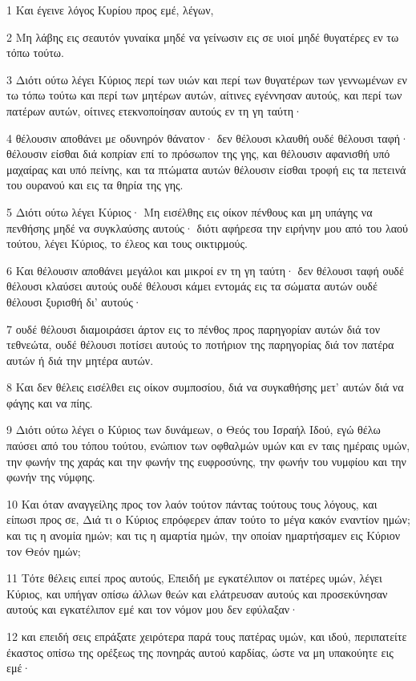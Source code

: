 \par 1 Και έγεινε λόγος Κυρίου προς εμέ, λέγων,
\par 2 Μη λάβης εις σεαυτόν γυναίκα μηδέ να γείνωσιν εις σε υιοί μηδέ θυγατέρες εν τω τόπω τούτω.
\par 3 Διότι ούτω λέγει Κύριος περί των υιών και περί των θυγατέρων των γεννωμένων εν τω τόπω τούτω και περί των μητέρων αυτών, αίτινες εγέννησαν αυτούς, και περί των πατέρων αυτών, οίτινες ετεκνοποίησαν αυτούς εν τη γη ταύτη·
\par 4 θέλουσιν αποθάνει με οδυνηρόν θάνατον· δεν θέλουσι κλαυθή ουδέ θέλουσι ταφή· θέλουσιν είσθαι διά κοπρίαν επί το πρόσωπον της γης, και θέλουσιν αφανισθή υπό μαχαίρας και υπό πείνης, και τα πτώματα αυτών θέλουσιν είσθαι τροφή εις τα πετεινά του ουρανού και εις τα θηρία της γης.
\par 5 Διότι ούτω λέγει Κύριος· Μη εισέλθης εις οίκον πένθους και μη υπάγης να πενθήσης μηδέ να συγκλαύσης αυτούς· διότι αφήρεσα την ειρήνην μου από του λαού τούτου, λέγει Κύριος, το έλεος και τους οικτιρμούς.
\par 6 Και θέλουσιν αποθάνει μεγάλοι και μικροί εν τη γη ταύτη· δεν θέλουσι ταφή ουδέ θέλουσι κλαύσει αυτούς ουδέ θέλουσι κάμει εντομάς εις τα σώματα αυτών ουδέ θέλουσι ξυρισθή δι' αυτούς·
\par 7 ουδέ θέλουσι διαμοιράσει άρτον εις το πένθος προς παρηγορίαν αυτών διά τον τεθνεώτα, ουδέ θέλουσι ποτίσει αυτούς το ποτήριον της παρηγορίας διά τον πατέρα αυτών ή διά την μητέρα αυτών.
\par 8 Και δεν θέλεις εισέλθει εις οίκον συμποσίου, διά να συγκαθήσης μετ' αυτών διά να φάγης και να πίης.
\par 9 Διότι ούτω λέγει ο Κύριος των δυνάμεων, ο Θεός του Ισραήλ Ιδού, εγώ θέλω παύσει από του τόπου τούτου, ενώπιον των οφθαλμών υμών και εν ταις ημέραις υμών, την φωνήν της χαράς και την φωνήν της ευφροσύνης, την φωνήν του νυμφίου και την φωνήν της νύμφης.
\par 10 Και όταν αναγγείλης προς τον λαόν τούτον πάντας τούτους τους λόγους, και είπωσι προς σε, Διά τι ο Κύριος επρόφερεν άπαν τούτο το μέγα κακόν εναντίον ημών; και τις η ανομία ημών; και τις η αμαρτία ημών, την οποίαν ημαρτήσαμεν εις Κύριον τον Θεόν ημών;
\par 11 Τότε θέλεις ειπεί προς αυτούς, Επειδή με εγκατέλιπον οι πατέρες υμών, λέγει Κύριος, και υπήγαν οπίσω άλλων θεών και ελάτρευσαν αυτούς και προσεκύνησαν αυτούς και εγκατέλιπον εμέ και τον νόμον μου δεν εφύλαξαν·
\par 12 και επειδή σεις επράξατε χειρότερα παρά τους πατέρας υμών, και ιδού, περιπατείτε έκαστος οπίσω της ορέξεως της πονηράς αυτού καρδίας, ώστε να μη υπακούητε εις εμέ·
